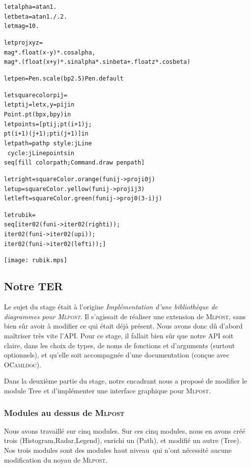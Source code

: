 \documentclass[a4paper,12pt]{article}
\newcommand{\mlpost}{\textsc{Mlpost}}
\begin{document}
\begin{minipage}{0.7\linewidth}
  \begin{alltt}
    let alpha = atan 1.
    let beta = atan 1. /. 2. 
    let mag = 10.
    
    let proj x y z = 
    mag *. float (x - y) *. cos alpha, 
    mag *. (float (x + y) *. sin alpha *. sin beta +. float z *. cos beta)
    
    let pen = Pen.scale (bp 2.5) Pen.default
  
    let square color p i j =
    let pt i j = let x,y = p i j in 
    Point.pt (bp x, bp y) in
    let points = [pt i j; pt (i+1) j; 
      pt (i+1) (j+1); pt i (j+1)] in
    let path = pathp ~style:jLine 
    ~cycle:jLine points in
    seq [fill ~color path; Command.draw ~pen path]
    
    let right = square Color.orange (fun i j -> proj i 0 j)
    let up = square Color.yellow (fun i j -> proj i j 3)
    let left = square Color.green (fun i j -> proj 0 (3 - i) j)
    
    let rubik = 
    seq [iter 0 2 (fun i -> iter 0 2 (right i));
      iter 0 2 (fun i -> iter 0 2 (up i));
      iter 0 2 (fun i -> iter 0 2 (left i));]
  \end{alltt}
\end{minipage}
\begin{minipage}{0.3\linewidth}
  \begin{center}
    \texttt{[image: rubik.mps]}
  \end{center}
\end{minipage}

\subsection{Notre TER}
Le sujet du stage était à l'origine \textit{Implémentation d'une
  bibliothèque de diagrammes pour \mlpost}. Il s'agissait de réaliser une extension de \mlpost, sans bien sûr avoir à modifier ce qui était déjà présent. Nous avons donc dû d'abord maîtriser très vite l'API.
Pour ce stage, il fallait bien sûr que notre API soit claire, dans les choix de types, de noms de fonctions et d'arguments (surtout optionnels), et qu'elle soit accompagnée d'une documentation (conçue avec \textsc{OCamldoc}).

Dans la deuxième partie du stage, notre encadrant nous a proposé de modifier le module Tree et d'implémenter une interface graphique pour \mlpost.

\subsubsection{Modules au dessus de \mlpost}
Nous avons travaillé sur cinq modules. 
Sur ces cinq modules, nous en avons créé trois (Histogram,Radar,Legend), enrichi un (Path), et modifié un autre (Tree).
Nos trois modules sont des modules \og haut niveau\fg\ qui n'ont nécessité aucune modification du noyau de \mlpost. 
\end{document}
